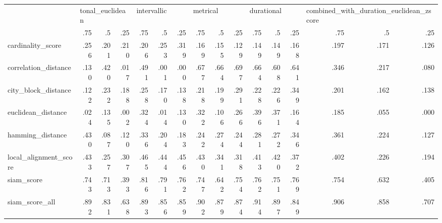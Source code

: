 \begin{tabular}{lrrrrrrrrrrrrrrr}
\toprule
{} & \multicolumn{3}{l}{tonal\_euclidean} & \multicolumn{3}{l}{intervallic} & \multicolumn{3}{l}{metrical} & \multicolumn{3}{l}{durational} & \multicolumn{3}{l}{combined\_with\_duration\_euclidean\_zscore} \\
{} & .75 & .5 & .25 & .75 & .5 & .25 & .75 & .5 & .25 & .75 & .5 & .25 & .75 & .5 & .25 \\
\midrule
cardinality\_score     & .256 & .201 & .210 & .206 & .253 & .319 & .169 & .155 & .129 & .149 & .149 & .168 & .197 & .171 & .126 \\
correlation\_distance  & .130 & .420 & .017 & .491 & .001 & .000 & .677 & .664 & .697 & .664 & .608 & .641 & .346 & .217 & .080 \\
city\_block\_distance   & .122 & .232 & .188 & .258 & .170 & .138 & .218 & .199 & .291 & .228 & .226 & .349 & .201 & .162 & .138 \\
euclidean\_distance    & .024 & .135 & .002 & .324 & .014 & .130 & .322 & .106 & .266 & .396 & .371 & .164 & .185 & .055 & .000 \\
hamming\_distance      & .430 & .087 & .120 & .336 & .204 & .183 & .242 & .274 & .244 & .281 & .272 & .346 & .361 & .224 & .127 \\
local\_alignment\_score & .433 & .257 & .307 & .465 & .444 & .456 & .430 & .341 & .318 & .413 & .420 & .372 & .402 & .226 & .194 \\
siam\_score            & .743 & .713 & .393 & .816 & .791 & .762 & .747 & .642 & .754 & .762 & .751 & .769 & .754 & .632 & .405 \\
siam\_score\_all        & .892 & .831 & .638 & .893 & .856 & .859 & .902 & .879 & .874 & .914 & .897 & .849 & .906 & .858 & .707 \\
\bottomrule
\end{tabular}

